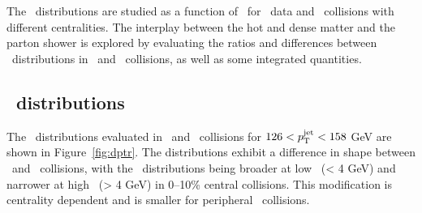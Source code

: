 
The \Dptr\ distributions are studied as a function of \ptjet\ for \pp\ data and \PbPb\ collisions with different centralities.
The interplay between the hot and dense matter and the parton shower is explored by evaluating the ratios and differences between \Dptr\ distributions in \pbpb\ and \pp\ collisions, as well as some integrated quantities.



\subsection{\Dptr\ distributions}
\label{sec:dptr}
The \Dptr\ distributions evaluated in \pp\ and \pbpb\ collisions for $126 < \mbox{$p_{\mathrm{T}}^{\mathrm{jet}}$} < 158$ GeV are shown in Figure~\ref{fig:dptr}.
The distributions exhibit a difference in shape between \PbPb\ and \pp\ collisions, with the \pbpb\ distributions being broader at low \pt\ (\pt < 4 GeV) and narrower at high \pt\ (\pt > 4 GeV) in \mbox{0--10\%} central collisions.
This modification is centrality dependent and is smaller for peripheral \pbpb\ collisions.

